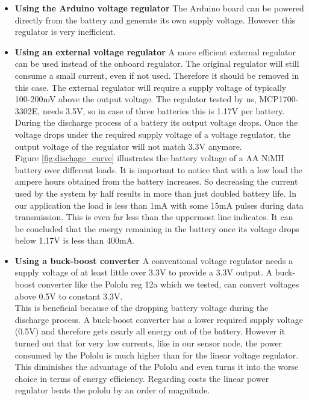 \begin{itemize}
\item \textbf{Using the Arduino voltage regulator}
The Arduino board can be powered directly from the battery and generate its own supply voltage.
However this regulator is very inefficient.

\item \textbf{Using an external voltage regulator}
A more efficient external regulator can be used instead of the onboard regulator. The original regulator will still consume a small current, even if not used. Therefore it should be removed in this case. The external regulator will require a supply voltage of typically 100-200mV above the output voltage. The regulator tested by us, MCP1700-3302E, needs 3.5V, so in case of three batteries this is 1.17V per battery.\\
During the discharge process of a battery its output voltage drops. Once the voltage drops under the required supply voltage of a voltage regulator, the output voltage of the regulator will not match 3.3V anymore.\\
Figure \ref{fig:dischage_curve} illustrates the battery voltage of a AA NiMH battery over different loads. %
It is important to notice that with a low load the ampere hours obtained from the battery increases. So decreasing the current used by the system by half results in more than just doubled battery life.
In our application the load is less than 1mA with some 15mA pulses during data transmission. This is even far less than the uppermost line indicates. It can be concluded that the energy remaining in the battery once its voltage drops below 1.17V is less than 400mA.

\item \textbf{Using a buck-boost converter}
A conventional voltage regulator needs a supply voltage of at least little over 3.3V to provide a 3.3V output.
A buck-boost converter like the Pololu reg 12a which we tested, can convert voltages above 0.5V to constant 3.3V.\\
This is beneficial because of the dropping battery voltage during the discharge process. 
A buck-boost converter has a lower required supply voltage (0.5V) and therefore gets nearly all energy out of the battery. However it turned out that for very low currents, like in our sensor node, the power consumed by the Pololu is much higher than for the linear voltage regulator. This diminishes the advantage of the Pololu and even turns it into the worse choice in terms of energy efficiency. Regarding costs the linear power regulator beats the pololu by an order of magnitude.

\end{itemize}


